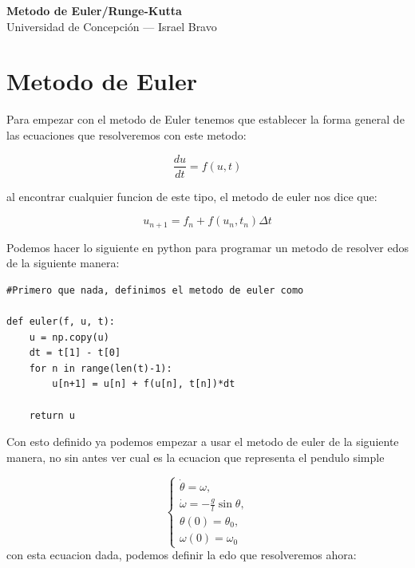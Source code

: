\documentclass[11pt,a4paper]{article}
\begin{document}
\begin{center}
    {\LARGE \textbf{Metodo de Euler/Runge-Kutta}}\\[4pt]
    {\large Universidad de Concepción — Israel Bravo}\\[10pt]
    \hrulefill
\end{center}

\section*{Metodo de Euler}
Para empezar con el metodo de Euler tenemos que establecer la forma general de las ecuaciones que resolveremos con este metodo:

\begin{equation}
	\frac{du}{dt} = f(u,t)
\end{equation}

al encontrar cualquier funcion de este tipo, el metodo de euler nos dice que:

\begin{equation}
	u_{n+1}=f_n+f(u_n,t_n) \Delta t
\end{equation}

Podemos hacer lo siguiente en python para programar un metodo de resolver edos de la siguiente manera:

\begin{lstlisting}[caption={Programar el metodo de Euler}]
#Primero que nada, definimos el metodo de euler como

def euler(f, u, t): 
    u = np.copy(u)
    dt = t[1] - t[0]
    for n in range(len(t)-1): 
        u[n+1] = u[n] + f(u[n], t[n])*dt

    return u
\end{lstlisting}
Con esto definido ya podemos empezar a usar el metodo de euler de la siguiente manera, no sin antes ver cual es la ecuacion que representa el pendulo simple

\begin{equation}
\begin{cases}
\dot{\theta} = \omega, \\
\dot{\omega} = -\frac{g}{l} \sin\theta, \\
\theta(0) = \theta_0, \\
\omega(0) = \omega_0
\end{cases}
\end{equation}
con esta ecuacion dada, podemos definir la edo que resolveremos ahora:
\end{document}
